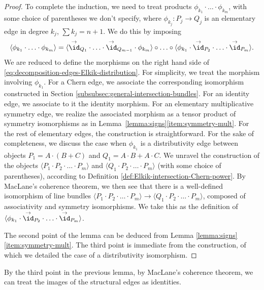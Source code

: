 \begin{proof}
To complete the induction, we need to treat products $\phi_{k_1} \cdot \ldots \cdot\phi_{k_m}$, with some choice of parentheses we don't specify, where $\phi_{k_j}: P_j \to Q_j$ is an elementary edge in degree $k_j$, $\sum k_j = n+1$. We do this by imposing
\begin{equation}\label{eq:decomposition-edges-Elkik-distribution}
\langle\phi_{k_1}\cdot\ldots\cdot\phi_{k_m}\rangle=\langle\overset{\to}{\id}_{Q_{1}}\cdot\ldots\cdot\overset{\to}{\id}_{Q_{m-1}}\cdot\phi_{k_m}\rangle\circ\ldots\circ\langle\phi_{k_1}\cdot\overset{\to}{\id}_{P_{2}}\cdot\ldots\cdot\overset{\to}{\id}_{P_{m}}\rangle.
\end{equation}
We are reduced to define the morphisms on the right hand side of \eqref{eq:decomposition-edges-Elkik-distribution}. For simplicity, we treat the morphism involving $\phi_{k_{1}}$. For a Chern edge, we associate the corresponding isomorphism constructed in Section \ref{subsubsec:general-intersection-bundles}. For an identity edge, we associate to it the identity morphism. For an elementary multiplicative symmetry edge, we realize the associated morphism as a tensor product of symmetry isomorphisms as in Lem\-ma~\ref{lemma:signs}\eqref{item:symmetry-mult}. For the rest of elementary edges, the construction is straightforward. For the sake of completeness, we discuss the case when $\phi_{k_{1}}$ is a distributivity edge between objects $P_{1}=A\cdot(B+C)$ and $Q_{1}=A\cdot B+A\cdot C$. We unravel the construction of the objects $\langle P_{1}\cdot P_{2}\cdot\ldots\cdot P_{m}\rangle$ and $\langle Q_{1}\cdot P_{2}\cdot\ldots\cdot P_{m}\rangle$ (with some choice of parentheses), according to Definition \ref{def:Elkik-intersection-Chern-power}. By MacLane's coherence theorem, we then see that there is a well-defined isomorphism of line bundles $\langle P_{1}\cdot P_{2}\cdot\ldots\cdot P_{m}\rangle\to \langle Q_{1}\cdot P_{2}\cdot\ldots\cdot P_{m}\rangle$, composed of associativity and symmetry isomorphisms. We take this as the definition of $\langle\phi_{k_1}\cdot\overset{\to}{\id}_{P_{2}}\cdot\ldots\cdot\overset{\to}{\id}_{P_{m}}\rangle$.

The second point of the lemma can be deduced from Lemma \ref{lemma:signs}\eqref{item:symmetry-mult}. The third point is immediate from the construction, of which we detailed the case of a distributivity isomorphism.
\end{proof}

\begin{remark}
By the third point in the previous lemma, by MacLane's coherence theorem, we can treat the images of the structural edges as identities.
\end{remark}

